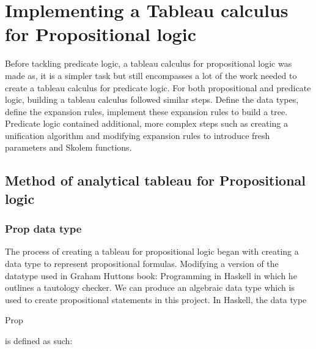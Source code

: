 \documentclass{article}%
\begin{document}
\section{Implementing a Tableau calculus for Propositional logic}
Before tackling predicate logic, a tableau calculus for propositional logic was made as, it is a simpler task but still encompasses a lot of the work needed to create a tableau calculus for predicate logic. For both propositional and predicate logic, building a tableau calculus followed similar steps. Define the data types, define the expansion rules, implement these expansion rules to build a tree. Predicate logic contained additional, more complex steps such as creating a unification algorithm and modifying expansion rules to introduce fresh parameters and Skolem functions. 
\subsection{Method of analytical tableau for Propositional logic}

\subsubsection{Prop data type}
The process of creating a tableau for propositional logic began with creating a data type to represent propositional formulas.  Modifying a version of the datatype used in Graham Huttons book: Programming in Haskell in which he outlines a tautology checker. We can produce an algebraic data type which is used to create propositional statements in this project.
In Haskell, the data type \begin{myTypeVarStyle}Prop\end{myTypeVarStyle} is defined as such: 
\vspace{5mm}
\end{document}
